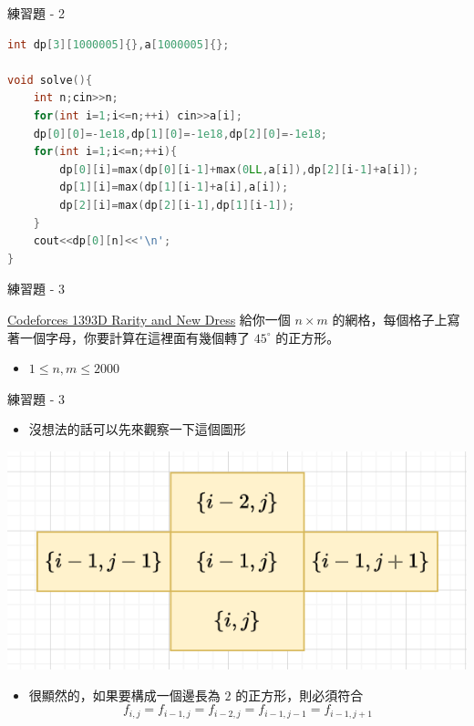 \documentclass[aspectratio=169]{beamer}
\begin{document}
    \begin{frame}[fragile]{練習題 - 2}
        \begin{lstlisting}[language=C++, basicstyle=\ttfamily \tiny]
int dp[3][1000005]{},a[1000005]{};

void solve(){
    int n;cin>>n;
    for(int i=1;i<=n;++i) cin>>a[i];
    dp[0][0]=-1e18,dp[1][0]=-1e18,dp[2][0]=-1e18;
    for(int i=1;i<=n;++i){
        dp[0][i]=max(dp[0][i-1]+max(0LL,a[i]),dp[2][i-1]+a[i]);
        dp[1][i]=max(dp[1][i-1]+a[i],a[i]);
        dp[2][i]=max(dp[2][i-1],dp[1][i-1]);
    }
    cout<<dp[0][n]<<'\n';
}
        \end{lstlisting}
    \end{frame}

    \begin{frame}{練習題 - 3}
        \begin{block}{\href{https://codeforces.com/contest/1393/problem/D}{Codeforces 1393D Rarity and New Dress}}
            給你一個 $n \times m$ 的網格，每個格子上寫著一個字母，你要計算在這裡面有幾個轉了 $45^{\circ}$ 的正方形。
            \begin{itemize} 
                \item $1 \le n,m \le 2000$
            \end{itemize}
        \end{block}
    \end{frame}

    \begin{frame}{練習題 - 3}
        \begin{itemize}
            \item 沒想法的話可以先來觀察一下這個圖形
        \end{itemize}
         \begin{center}
            \includegraphics[scale=0.5]{images/CF1393D_i,j.png}
        \end{center}
        \begin{itemize}
            \item<2-> 很顯然的，如果要構成一個邊長為 $2$ 的正方形，則必須符合
            $$f_{i,j} = f_{i-1,j} = f_{i-2,j} = f_{i-1,j-1} = f_{i-1,j+1}$$
        \end{itemize}
    \end{frame}
\end{document}
